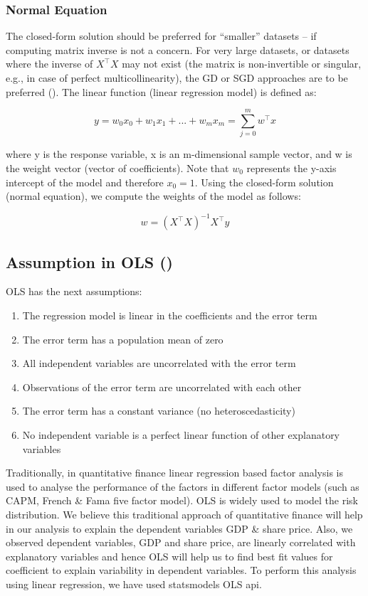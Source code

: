 \documentclass{elsarticle}
\begin{document}
\subsubsection{Normal Equation}
The closed-form solution should be preferred for “smaller” datasets – if computing matrix inverse is not a concern. For very large datasets, or datasets where the inverse of $X^\top X$ may not exist (the matrix is non-invertible or singular, e.g., in case of perfect multicollinearity), the GD or SGD approaches are to be preferred (\cite{Raschka2017}). The linear function (linear regression model) is defined as:

$$y = w_{0}x_{0}+w_{1}x_{1}+...+w_{m}x_{m} = \sum_{j=0}^{m} w^\top x$$

where y is the response variable, x is an m-dimensional sample vector, and w is the weight vector (vector of coefficients). Note that $w_0$ represents the y-axis intercept of the model and therefore $x_0=1$. Using the closed-form solution (normal equation), we compute the weights of the model as follows:

$$w = (X^\top X)^{-1}X^\top y$$

\subsection{Assumption in OLS (\cite{DeFusco2007})}
OLS has the next assumptions:
\begin{enumerate}
    \item The regression model is linear in the coefficients and the error term
    \item The error term has a population mean of zero
    \item All independent variables are uncorrelated with the error term
    \item Observations of the error term are uncorrelated with each other
    \item The error term has a constant variance (no heteroscedasticity)
    \item No independent variable is a perfect linear function of other explanatory variables
\end{enumerate}

Traditionally, in quantitative finance linear regression based factor analysis is used to analyse the performance of the factors in different factor models (such as CAPM, French & Fama five factor model). OLS is widely used to model  the risk distribution. We believe this  traditional approach of quantitative finance will help in our analysis to explain the dependent variables GDP & share price. Also, we observed dependent variables, GDP and share price, are linearly correlated with explanatory variables and hence OLS will help us to find best fit values for coefficient to  explain variability in dependent variables. To perform this analysis using linear regression, we have used statsmodels OLS api.
\end{document}
